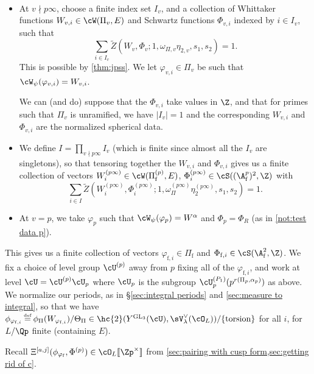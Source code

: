 \documentclass[10pt,reqno,a4paper]{amsart}
\newcommand{\Pif}{\Pi\subf}
\newcommand{\subf}{_{\mathrm{f}}}
\newcommand{\GL}{\mathrm{GL}}
\begin{document}
\begin{notation}\label{not:test data} \
\begin{itemize}\setlength{\itemsep}{0pt}
	
 \item[--] At $v \nmid p\infty$, choose a finite index set $I_v$, and a collection of Whittaker functions $W_{v, i} \in \cW(\Pi_v, E)$ and Schwartz functions $\Phi_{v, i}$ indexed by $i \in I_v$, such that 
 \[ \sum_{i \in I_v} \widetilde{Z}(W_v,\Phi_v; 1,\omega_{\Pi,v}\eta_{2,v},s_1,s_2) = 1.\]
 This is possible by \cref{thm:jpss}. We let $\varphi_{v, i} \in \Pi_v$ be such that $\cW_\psi(\varphi_{v, i}) = W_{v, i}$. 
 
 We can (and do) suppose that the $\Phi_{v, i}$ take values in $\Z$, and that for primes such that $\Pi_v$ is unramified, we have $|I_v| = 1$ and the corresponding $W_{v, i}$ and $\Phi_{v, i}$ are the normalized spherical data.
 
 \item[--] We define $I = \prod_{v \nmid p\infty} I_v$ (which is finite since almost all the $I_v$ are singletons), so that tensoring together the $W_{v, i}$ and $\Phi_{v, i}$ gives us a finite collection of vectors $W_i^{(p\infty)} \in \cW(\Pi^{(p)}\subf, E)$, $\Phi_i^{(p\infty)} \in \cS((\A\subf^{p})^2, \Z)$ with
 \[ \sum_{i \in I} \widetilde{Z}\left(W_i^{(p\infty)}, \Phi_i^{(p\infty)}; 1,\omega_{\Pi}^{(p\infty)} \eta_{2}^{(p\infty)} ,s_1,s_2\right) = 1.\]
  

	\item[--] At $v = p$, we take $\varphi_p$ such that $\cW_\psi(\varphi_p) =  W^\alpha$ and $\Phi_p = \Phi_R$ (as in \cref{not:test data p}).
\end{itemize}
\end{notation}

This gives us a finite collection of vectors $\varphi_{\mathrm{f}, i} \in \Pif$ and $\Phi_{\mathrm{f}, i} \in \cS(\A\subf^2, \Z)$. We fix a choice of level group $\cU^{(p)}$ away from $p$ fixing all of the $\varphi_{\mathrm{f}, i}$, and work at level $\cU= \cU^{(p)}\cU_p$ where $\cU_p$ is the subgroup $\cU_p^{(P_1)}(p^{r(\Pi_p, \alpha_p)})$ as above. We normalize our periods, as in \S\ref{sec:integral periods} and \cref{sec:measure to integral}, so that we have $\phi_{\varphi_{\mathrm{f}, i}} \defeq \phi_\Pi(W_{\varphi_{\mathrm{f}, i}})/\Theta_\Pi \in \hc{2}(Y^{\GL_3}(\cU),\sV_\lambda^\vee(\cO_L)) / \{\mathrm{torsion}\}$ for all $i$, for $L/\Qp$ finite (containing $E$).

Recall $\Xi^{[a,j]}(\phi_{\varphi\subf},\Phi^{(p)}) \in \cO_L[\![\Zp^\times]\!]$ from \cref {sec:pairing with cusp form,sec:getting rid of c}.
\end{document}
